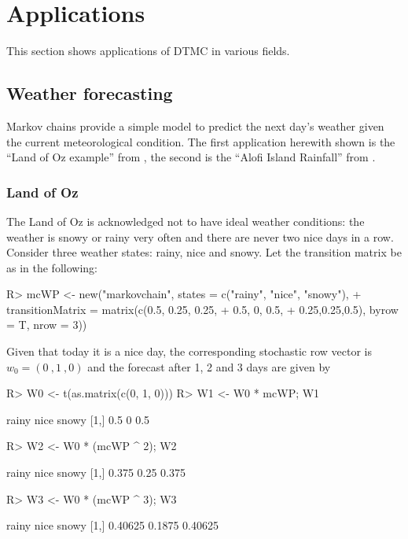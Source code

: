 \documentclass[
  nojss]{jss}
\begin{document}
\section{Applications}\label{sec:applications}

This section shows applications of DTMC in various fields.

\subsection{Weather forecasting}\label{app:weather}

Markov chains provide a simple model to predict the next day's weather given the current meteorological condition. The first application herewith shown is the ``Land of Oz example'' from \cite{landOfOz}, the second is the ``Alofi Island Rainfall'' from \cite{averyHenderson}.

\subsubsection{Land of Oz}\label{sec:wfLandOfOz}

The Land of Oz is
acknowledged not to have ideal weather conditions:
the weather is snowy or rainy very often and there are never two
nice days in a row. Consider three weather states: rainy, nice and snowy. Let the transition matrix be as in the following:

\begin{CodeChunk}
\begin{CodeInput}
R> mcWP <- new("markovchain", states = c("rainy", "nice", "snowy"),
+          transitionMatrix = matrix(c(0.5, 0.25, 0.25,
+                                    0.5, 0, 0.5,
+                                    0.25,0.25,0.5), byrow = T, nrow = 3))
\end{CodeInput}
\end{CodeChunk}

Given that today it is a nice day, the corresponding stochastic row vector is
\(w_{0}=(0\:,1\:,0)\) and the forecast after 1, 2 and 3 days are given by

\begin{CodeChunk}
\begin{CodeInput}
R> W0 <- t(as.matrix(c(0, 1, 0)))
R> W1 <- W0 * mcWP; W1
\end{CodeInput}
\begin{CodeOutput}
     rainy nice snowy
[1,]   0.5    0   0.5
\end{CodeOutput}
\begin{CodeInput}
R> W2 <- W0 * (mcWP ^ 2); W2
\end{CodeInput}
\begin{CodeOutput}
     rainy nice snowy
[1,] 0.375 0.25 0.375
\end{CodeOutput}
\begin{CodeInput}
R> W3 <- W0 * (mcWP ^ 3); W3
\end{CodeInput}
\begin{CodeOutput}
       rainy   nice   snowy
[1,] 0.40625 0.1875 0.40625
\end{CodeOutput}
\end{CodeChunk}
\end{document}
